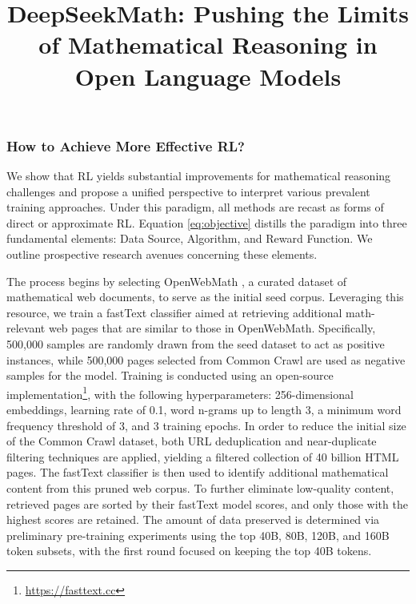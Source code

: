 \title{DeepSeekMath: Pushing the Limits of Mathematical Reasoning in Open Language Models}
\subsubsection{How to Achieve More Effective RL?}
\label{sec:effec_rl}
We show that RL yields substantial improvements for mathematical reasoning challenges and propose a unified perspective to interpret various prevalent training approaches. Under this paradigm, all methods are recast as forms of direct or approximate RL. Equation \ref{eq:objective} distills the paradigm into three fundamental elements: Data Source, Algorithm, and Reward Function. We outline prospective research avenues concerning these elements.

The process begins by selecting OpenWebMath \citep{openwebmath}, a curated dataset of mathematical web documents, to serve as the initial seed corpus. Leveraging this resource, we train a fastText classifier \citep{joulin2016fasttext} aimed at retrieving additional math-relevant web pages that are similar to those in OpenWebMath. Specifically, 500,000 samples are randomly drawn from the seed dataset to act as positive instances, while 500,000 pages selected from Common Crawl are used as negative samples for the model. Training is conducted using an open-source implementation\footnote{\url{https://fasttext.cc}}, with the following hyperparameters: 256-dimensional embeddings, learning rate of 0.1, word n-grams up to length 3, a minimum word frequency threshold of 3, and 3 training epochs. In order to reduce the initial size of the Common Crawl dataset, both URL deduplication and near-duplicate filtering techniques are applied, yielding a filtered collection of 40 billion HTML pages. The fastText classifier is then used to identify additional mathematical content from this pruned web corpus. To further eliminate low-quality content, retrieved pages are sorted by their fastText model scores, and only those with the highest scores are retained. The amount of data preserved is determined via preliminary pre-training experiments using the top 40B, 80B, 120B, and 160B token subsets, with the first round focused on keeping the top 40B tokens.

